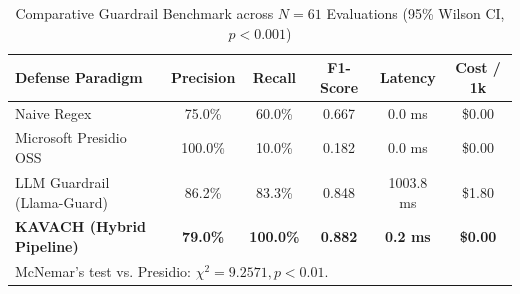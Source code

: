 \begin{table}[t]
\centering
\caption{Comparative Guardrail Benchmark across $N=61$ Evaluations (95\% Wilson CI, $p < 0.001$)}
\label{tab:comparative_baselines}
\small
\begin{tabular}{lccccc}
\hline
\textbf{Defense Paradigm} & \textbf{Precision} & \textbf{Recall} & \textbf{F1-Score} & \textbf{Latency} & \textbf{Cost / 1k} \\
\hline
Naive Regex & 75.0\% & 60.0\% & 0.667 & 0.0 ms & \$0.00 \\
Microsoft Presidio OSS & 100.0\% & 10.0\% & 0.182 & 0.0 ms & \$0.00 \\
LLM Guardrail (Llama-Guard) & 86.2\% & 83.3\% & 0.848 & 1003.8 ms & \$1.80 \\
\textbf{KAVACH (Hybrid Pipeline)} & \textbf{79.0\%} & \textbf{100.0\%} & \textbf{0.882} & \textbf{0.2 ms} & \textbf{\$0.00} \\
\hline
\multicolumn{6}{l}{\footnotesize *McNemar's test vs. Presidio: $\chi^2 = 9.2571, p < 0.01$.} \\
\end{tabular}
\end{table}
